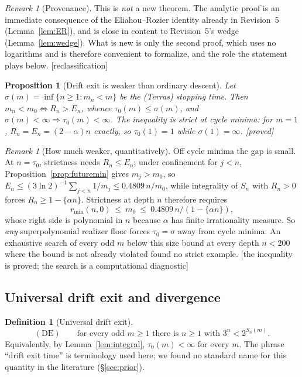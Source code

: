 \documentclass[11pt]{article}
\theoremstyle{plain}
\newtheorem{proposition}[theorem]{Proposition}
\theoremstyle{definition}
\newtheorem{definition}[theorem]{Definition}
\theoremstyle{remark}
\newtheorem{remark}[theorem]{Remark}
\newcommand{\al}{\alpha}
\newcommand{\rmin}{r_{\min}}
\newcommand{\status}[1]{\textsf{\footnotesize[#1]}}
\begin{document}
\begin{remark}[Provenance]
This is \emph{not} a new theorem. The analytic proof is an immediate consequence of the
Eliahou--Rozier identity already in Revision~5 (Lemma~\ref{lem:ER}), and is close in content to
Revision~5's wedge (Lemma~\ref{lem:wedge}). What is new is only the second proof, which uses no
logarithms and is therefore convenient to formalize, and the role the statement plays below.
\status{reclassification}
\end{remark}

\begin{proposition}[Drift exit is weaker than ordinary descent]\label{prop:weaker}
Let $\sigma(m)=\inf\{n\ge1:m_n<m\}$ be the (Terras) stopping time. Then $m_n<m_0\iff R_n>E_n$,
whence $\tau_0(m)\le\sigma(m)$, and $\sigma(m)<\infty\Rightarrow\tau_0(m)<\infty$. The inequality
is strict at cycle minima: for $m=1$, $R_n=E_n=(2-\al)n$ exactly, so $\tau_0(1)=1$ while
$\sigma(1)=\infty$. \status{proved}
\end{proposition}

\begin{remark}[How much weaker, quantitatively]\label{rem:howweak}
Off cycle minima the gap is small. At $n=\tau_0$, strictness needs $R_n\le E_n$; under confinement
for $j<n$, Proposition~\ref{prop:futuremin} gives $m_j>m_0$, so
$E_n\le(3\ln2)^{-1}\sum_{j<n}1/m_j\le 0.4809\,n/m_0$, while integrality of $S_n$ with $R_n>0$
forces $R_n\ge1-\{\al n\}$. Strictness at depth $n$ therefore requires
\[
\rmin(n,0)\ \le\ m_0\ \le\ 0.4809\,n/(1-\{\al n\}),
\]
whose right side is polynomial in $n$ because $\al$ has finite irrationality measure. So
\emph{any} superpolynomial realizer floor forces $\tau_0=\sigma$ away from cycle minima.
An exhaustive search of every odd $m$ below this size bound at every depth $n<200$ where the bound
is not already violated found no strict example. \status{the inequality is proved; the search is a
computational diagnostic}
\end{remark}

\subsection{Universal drift exit and divergence}\label{sec:DE}

\begin{definition}[Universal drift exit]
\[
(\mathrm{DE})\qquad\text{for every odd }m\ge1\text{ there is }n\ge1\text{ with } 3^n<2^{S_n(m)} .
\]
Equivalently, by Lemma~\ref{lem:integral}, $\tau_0(m)<\infty$ for every $m$. The phrase ``drift
exit time'' is terminology used here; we found no standard name for this quantity in the
literature (\S\ref{sec:prior}).
\end{definition}
\end{document}
